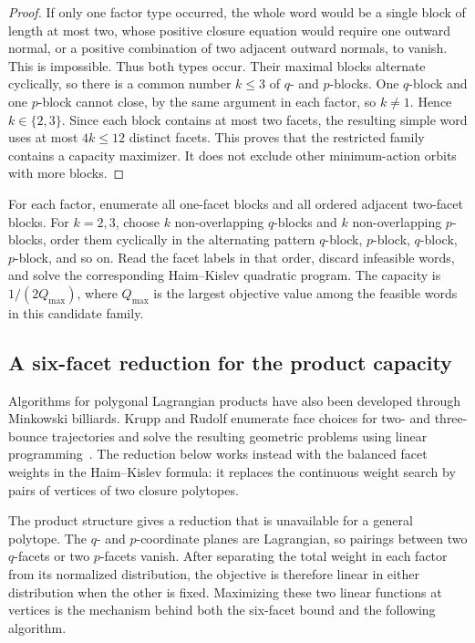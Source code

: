 \begin{proof}
If only one factor type occurred, the whole word would be a single block of
length at most two, whose positive closure equation would require one outward
normal, or a positive combination of two adjacent outward normals, to vanish.
This is impossible. Thus both types occur. Their maximal blocks alternate
cyclically, so there is a common number \(k\leq3\) of \(q\)- and \(p\)-blocks.
One \(q\)-block and one \(p\)-block cannot close, by the same argument in each
factor, so \(k\neq1\). Hence \(k\in\{2,3\}\). Since each block contains at most
two facets, the resulting simple word uses at most \(4k\leq12\) distinct
facets. This proves that the restricted family contains a capacity maximizer.
It does not exclude other minimum-action orbits with more blocks.
\end{proof}

\begin{algorithm}
\label{alg:lagrangian-product-capacity-enumeration}
For each factor, enumerate all one-facet blocks and all ordered adjacent
two-facet blocks. For \(k=2,3\), choose \(k\) non-overlapping \(q\)-blocks and
\(k\) non-overlapping \(p\)-blocks, order them cyclically in the alternating
pattern $q$-block, $p$-block, $q$-block, $p$-block, and so on.
Read the facet labels in that order, discard infeasible words, and solve the
corresponding Haim--Kislev quadratic program. The capacity is
\(1/(2Q_{\max})\), where \(Q_{\max}\) is the largest objective value among the
feasible words in this candidate family.
\end{algorithm}

\subsection{A six-facet reduction for the product capacity}

Algorithms for polygonal Lagrangian products have also been developed through
Minkowski billiards. Krupp and Rudolf enumerate face choices for two- and
three-bounce trajectories and solve the resulting geometric problems using
linear programming~\cite[Section~7.3]{KruppRudolf2022}.
The reduction below works instead with the balanced facet weights in the
Haim--Kislev formula: it replaces the continuous weight search by pairs of
vertices of two closure polytopes.

\label{subsec:quadratic-program-product-six-facet}

The product structure gives a reduction that is unavailable for a general
polytope.  The \(q\)- and \(p\)-coordinate planes are Lagrangian, so pairings
between two \(q\)-facets or two \(p\)-facets vanish.  After separating the
total weight in each factor from its normalized distribution, the objective
is therefore linear in either distribution when the other is fixed.
Maximizing these two linear functions at vertices is the mechanism behind
both the six-facet bound and the following algorithm.

